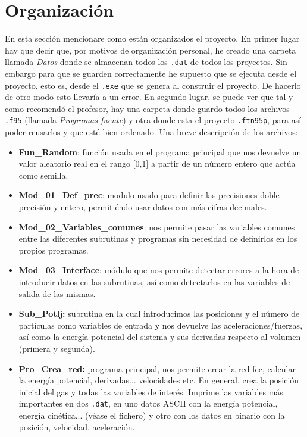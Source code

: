 \documentclass[11pt]{article}
\begin{document}
\section{Organización}

En esta sección mencionare como están organizados el proyecto. En primer lugar hay que decir que, por motivos de organización personal, he creado una carpeta llamada \textit{Datos} donde se almacenan todos los \texttt{.dat} de todos los proyectos. Sin embargo para que se guarden correctamente he supuesto que se ejecuta desde el proyecto, esto es, desde el \texttt{.exe} que se genera al construir el proyecto. De hacerlo de otro modo esto llevaría a un error. En segundo lugar, se puede ver que tal y como recomendó el profesor, hay una carpeta donde guardo todos los archivos \texttt{.f95} (llamada \textit{Programas fuente}) y otra donde esta el proyecto \texttt{.ftn95p}, para así poder reusarlos y que esté bien ordenado. Una breve descripción de los archivos:

\begin{itemize}
	\item \textbf{Fun\_Random}: función usada en el programa principal que nos devuelve un valor aleatorio real en el rango [0,1] a partir de un número entero que actúa como semilla.
	\item \textbf{Mod\_01\_Def\_prec}: modulo usado para definir las precisiones doble precisión y entero, permitiéndo usar datos con más cifras decimales.
	\item \textbf{Mod\_02\_Variables\_comunes}: nos permite pasar las variables comunes entre las diferentes subrutinas y programas sin necesidad de definirlos en los propios programas.
	\item \textbf{Mod\_03\_Interface}: módulo que nos permite detectar errores a la hora de introducir datos en las subrutinas, así como detectarlos en las variables de salida de las mismas.
	\item \textbf{Sub\_Potlj:} subrutina en la cual introducimos las posiciones y el número de partículas como variables de entrada y nos devuelve las aceleraciones/fuerzas, así como la energía potencial del sistema y sus derivadas respecto al volumen (primera y segunda).
	\item \textbf{Pro\_Crea\_red:} programa principal, nos permite crear la red fcc, calcular la energía potencial, derivadas... velocidades etc. En general, crea la posición inicial del gas y todas las variables de interés. Imprime las variables más importantes en dos \texttt{.dat}, en uno datos ASCII con la energía potencial, energía cinética... (véase el fichero) y otro con los datos en binario con la posición, velocidad, aceleración.
\end{itemize}




\end{document}
